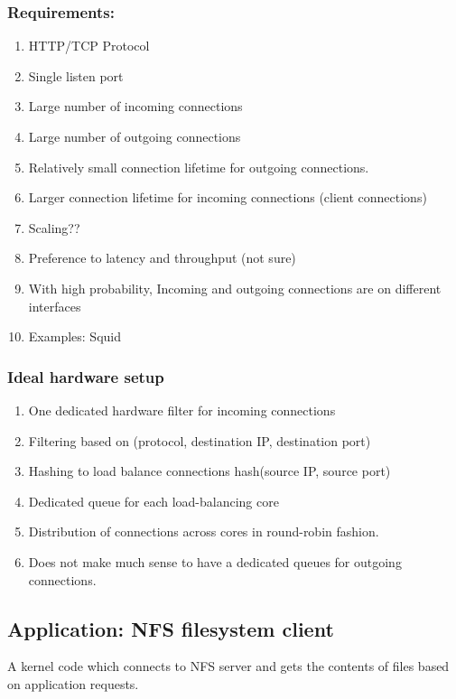 \subsubsection{Requirements:}
\begin{enumerate}
    \item HTTP/TCP Protocol
    \item Single listen port
    \item Large number of incoming connections
    \item Large number of outgoing connections
    \item Relatively small connection lifetime for outgoing connections.
    \item Larger connection lifetime for incoming connections (client connections)
    \item Scaling??
    \item Preference to latency and throughput (not sure)
    \item With high probability, Incoming and outgoing connections are on
            different interfaces
    \item Examples: Squid
\end{enumerate}

\subsubsection{Ideal hardware setup}
\begin{enumerate}
    \item One dedicated hardware filter for incoming connections
    \item Filtering based on (protocol, destination IP, destination port)
    \item Hashing to load balance connections hash(source IP, source port)
    \item Dedicated queue for each load-balancing core
    \item Distribution of connections across cores in round-robin fashion.
    \item Does not make much sense to have a dedicated queues for outgoing
            connections.
\end{enumerate}



\subsection{Application: NFS filesystem client}
A kernel code which connects to NFS server and gets the contents of files
based on application requests.
